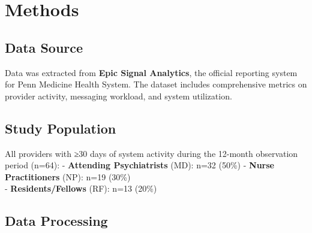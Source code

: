 \documentclass[
  11pt,
]{article}
\begin{document}
\section{Methods}\label{methods}

\subsection{Data Source}\label{data-source}

Data was extracted from \textbf{Epic Signal Analytics}, the official
reporting system for Penn Medicine Health System. The dataset includes
comprehensive metrics on provider activity, messaging workload, and
system utilization.

\subsection{Study Population}\label{study-population}

All providers with ≥30 days of system activity during the 12-month
observation period (n=64): - \textbf{Attending Psychiatrists} (MD): n=32
(50\%) - \textbf{Nurse Practitioners} (NP): n=19 (30\%)\\
- \textbf{Residents/Fellows} (RF): n=13 (20\%)

\subsection{Data Processing}\label{data-processing}
\end{document}
